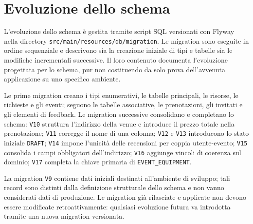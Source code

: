 \section{Evoluzione dello schema}

L'evoluzione dello schema è gestita tramite script SQL versionati con Flyway nella directory \texttt{src/main/resources/db/migration}. Le migration sono eseguite in ordine sequenziale e descrivono sia la creazione iniziale di tipi e tabelle sia le modifiche incrementali successive. Il loro contenuto documenta l'evoluzione progettata per lo schema, pur non costituendo da solo prova dell'avvenuta applicazione su uno specifico ambiente.

Le prime migration creano i tipi enumerativi, le tabelle principali, le risorse, le richieste e gli eventi; seguono le tabelle associative, le prenotazioni, gli invitati e gli elementi di feedback. Le migration successive consolidano e completano lo schema: \texttt{V10} struttura l'indirizzo della venue e introduce il prezzo totale nella prenotazione; \texttt{V11} corregge il nome di una colonna; \texttt{V12} e \texttt{V13} introducono lo stato iniziale \texttt{DRAFT}; \texttt{V14} impone l'unicità delle recensioni per coppia utente-evento; \texttt{V15} consolida i campi obbligatori dell'indirizzo; \texttt{V16} aggiunge vincoli di coerenza sul dominio; \texttt{V17} completa la chiave primaria di \texttt{EVENT\_EQUIPMENT}.

La migration \texttt{V9} contiene dati iniziali destinati all'ambiente di sviluppo; tali record sono distinti dalla definizione strutturale dello schema e non vanno considerati dati di produzione. Le migration già rilasciate e applicate non devono essere modificate retroattivamente: qualsiasi evoluzione futura va introdotta tramite una nuova migration versionata.
